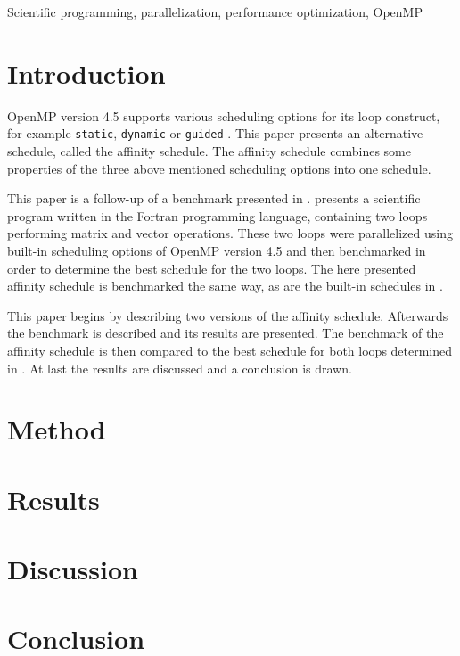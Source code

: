 \documentclass[twoside,11pt]{article}
\title{\titl}
\author{}
\begin{document}
\maketitle

\begin{abstract}
\end{abstract}

\begin{keywords}
Scientific programming, parallelization,
performance optimization, OpenMP
\end{keywords}

\section{Introduction} %

OpenMP version 4.5 supports various scheduling options for
its loop construct, for example \texttt{static},
\texttt{dynamic} or \texttt{guided}
\citep[see][Chapter 2]{omp}.
This paper presents an alternative schedule, called the
affinity schedule.
The affinity schedule combines some properties of the three
above mentioned scheduling options into one schedule.

This paper is a follow-up of a benchmark presented in
\citet{b1}.
\citet{b1} presents a scientific program written in the
Fortran programming language, containing two loops
performing matrix and vector operations.
These two loops were parallelized using built-in scheduling
options of OpenMP version 4.5 and then benchmarked in order
to determine the best schedule for the two loops.
The here presented affinity schedule is benchmarked the
same way, as are the built-in schedules in \citet{b1}.

This paper begins by describing two versions of the
affinity schedule. Afterwards the benchmark is described
and its results are presented. The benchmark of the
affinity schedule is then compared to the best schedule for
both loops determined in \citet{b1}.
At last the results are discussed and a conclusion is
drawn.


\section{Method} %


\section{Results} %


\section{Discussion} %


\section{Conclusion} %



\end{document}
